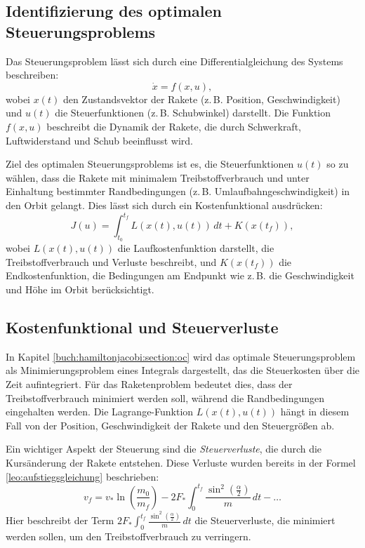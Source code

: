 \subsection{Identifizierung des optimalen Steuerungsproblems}

Das Steuerungsproblem lässt sich durch eine Differentialgleichung des Systems beschreiben:
\[
\dot{x} = f(x,u),
\]
wobei \(x(t)\) den Zustandsvektor der Rakete (z.\,B. Position, Geschwindigkeit) und \(u(t)\) die Steuerfunktionen (z.\,B. Schubwinkel) darstellt. Die Funktion \(f(x,u)\) beschreibt die Dynamik der Rakete, die durch Schwerkraft, Luftwiderstand und Schub beeinflusst wird.

Ziel des optimalen Steuerungsproblems ist es, die Steuerfunktionen \(u(t)\) so zu wählen, dass die Rakete mit minimalem Treibstoffverbrauch und unter Einhaltung bestimmter Randbedingungen (z.\,B. Umlaufbahngeschwindigkeit) in den Orbit gelangt. Dies lässt sich durch ein Kostenfunktional ausdrücken:
\[
J(u) = \int_{t_0}^{t_f} L(x(t), u(t))\, dt + K(x(t_f)),
\]
wobei \(L(x(t), u(t))\) die Laufkostenfunktion darstellt, die Treibstoffverbrauch und Verluste beschreibt, und \(K(x(t_f))\) die Endkostenfunktion, die Bedingungen am Endpunkt wie z.\,B. die Geschwindigkeit und Höhe im Orbit berücksichtigt.

\subsection{Kostenfunktional und Steuerverluste}

In Kapitel \ref{buch:hamiltonjacobi:section:oc} wird das optimale Steuerungsproblem als Minimierungsproblem eines Integrals dargestellt, das die Steuerkosten über die Zeit aufintegriert. Für das Raketenproblem bedeutet dies, dass der Treibstoffverbrauch minimiert werden soll, während die Randbedingungen eingehalten werden. Die Lagrange-Funktion \(L(x(t), u(t))\) hängt in diesem Fall von der Position, Geschwindigkeit der Rakete und den Steuergrößen ab.

Ein wichtiger Aspekt der Steuerung sind die \textit{Steuerverluste}, die durch die Kursänderung der Rakete entstehen. Diese Verluste wurden bereits in der Formel \eqref{leo:aufstiegsgleichung} beschrieben:
\[
v_f = v_* \ln \left(\frac{m_0}{m_f}\right) - 2F_* \int_0^{t_f} \frac{\sin^2\left(\frac{\alpha}{2}\right)}{m} \, dt - \dots
\]
Hier beschreibt der Term \(2F_* \int_0^{t_f} \frac{\sin^2\left(\frac{\alpha}{2}\right)}{m} \, dt\) die Steuerverluste, die minimiert werden sollen, um den Treibstoffverbrauch zu verringern.

